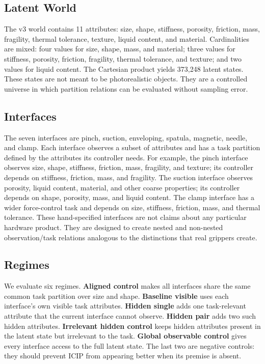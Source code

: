 \documentclass{article}
\newcommand{\icip}{\textsc{ICIP}}
\begin{document}
\subsection{Latent World}

The v3 world contains 11 attributes:
size, shape, stiffness, porosity, friction, mass, fragility, thermal tolerance, texture, liquid content, and material.
Cardinalities are mixed: four values for size, shape, mass, and material; three values for stiffness, porosity, friction, fragility, thermal tolerance, and texture; and two values for liquid content.
The Cartesian product yields 373,248 latent states.
These states are not meant to be photorealistic objects.
They are a controlled universe in which partition relations can be evaluated without sampling error.

\subsection{Interfaces}

The seven interfaces are pinch, suction, enveloping, spatula, magnetic, needle, and clamp.
Each interface observes a subset of attributes and has a task partition defined by the attributes its controller needs.
For example, the pinch interface observes size, shape, stiffness, friction, mass, fragility, and texture; its controller depends on stiffness, friction, mass, and fragility.
The suction interface observes porosity, liquid content, material, and other coarse properties; its controller depends on shape, porosity, mass, and liquid content.
The clamp interface has a wider force-control task and depends on size, stiffness, friction, mass, and thermal tolerance.
These hand-specified interfaces are not claims about any particular hardware product.
They are designed to create nested and non-nested observation/task relations analogous to the distinctions that real grippers create.

\subsection{Regimes}

We evaluate six regimes.
\textbf{Aligned control} makes all interfaces share the same common task partition over size and shape.
\textbf{Baseline visible} uses each interface's own visible task attributes.
\textbf{Hidden single} adds one task-relevant attribute that the current interface cannot observe.
\textbf{Hidden pair} adds two such hidden attributes.
\textbf{Irrelevant hidden control} keeps hidden attributes present in the latent state but irrelevant to the task.
\textbf{Global observable control} gives every interface access to the full latent state.
The last two are negative controls: they should prevent \icip{} from appearing better when its premise is absent.
\end{document}
